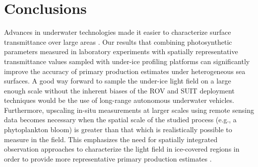 \section{Conclusions}

Advances in underwater technologies \DIFaddbegin {}\DIFaddend made it easier to characterize surface transmittance over large areas \DIFaddbegin {}\DIFaddend . Our results \DIFdelbegin {}\DIFdelend \DIFaddbegin {}\DIFaddend that combining photosynthetic parameters measured in laboratory experiments with spatially representative transmittance values sampled with under-ice profiling platforms can significantly improve the accuracy of primary production estimates under heterogeneous sea surfaces. A good way forward to sample the under-ice light field on a large enough scale without the inherent biases of the ROV and SUIT deployment techniques would be the use of long-range autonomous underwater vehicles. Furthermore, upscaling in-situ measurements at larger scales using remote sensing data becomes necessary when the spatial scale of the studied process (e.g., a phytoplankton bloom) is greater than that which is realistically possible to measure in the field. This emphasizes the need for spatially integrated observation approaches to characterize the light field in ice-covered regions in order to provide more representative primary production estimates \DIFaddbegin {}\DIFaddend .